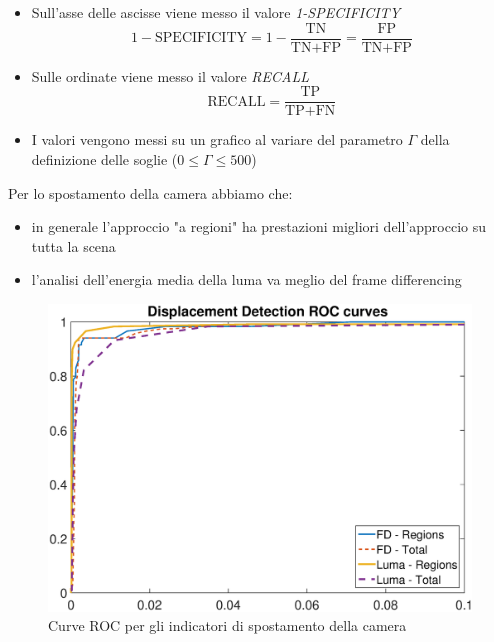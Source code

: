 \begin{itemize}
	\item Sull'asse delle ascisse viene messo il valore \textit{1-SPECIFICITY}
	\[1-\text{SPECIFICITY}= 1-\frac{\text{TN}}{\text{TN}+\text{FP}}=\frac{\text{FP}}{\text{TN}+\text{FP}}\]
	\item Sulle ordinate viene messo il valore \textit{RECALL}
	\[\text{RECALL}=\frac{\text{TP}}{\text{TP}+\text{FN}} \]
	\item I valori vengono messi su un grafico al variare del parametro $\Gamma$ della definizione delle soglie ($0 \leq \Gamma \leq 500$)
\end{itemize}
Per lo spostamento della camera abbiamo che:
\begin{itemize}
	\item in generale l'approccio "a regioni" ha prestazioni migliori dell'approccio su tutta la scena
	\item l'analisi dell'energia media della luma va meglio del frame differencing
\end{itemize}
\begin{figure}[tb]
\centering
\includegraphics[width=13cm]{diagrammi/ROC_displacement}
\caption{Curve ROC per gli indicatori di spostamento della camera}
\label{fig:ROC_displacement}
\end{figure}

